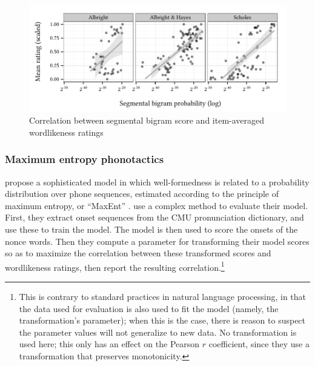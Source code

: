 \begin{figure}
\centering
\includegraphics{bigram.pdf}
\caption{Correlation between segmental bigram score and item-averaged wordlikeness ratings}
\label{bigram}
\end{figure}

\subsubsection{Maximum entropy phonotactics}

\citet{Hayes2008a} propose a sophisticated model in which well-formedness is related to a probability distribution over phone sequences, estimated according to the principle of maximum entropy, or ``MaxEnt'' \citep[e.g.,][]{Goldwater2003,Jager2007}. \citeauthor{Hayes2008a} use a complex method to evaluate their model. First, they extract onset sequences from the CMU pronunciation dictionary, and use these to train the model. The model is then used to score the onsets of the \citet{Scholes1966} nonce words. Then they compute a parameter for transforming their model scores so as to maximize the correlation between these transformed scores and wordlikeness ratings, then report the resulting correlation.\footnote{This is contrary to standard practices in natural language processing, in that the data used for evaluation is also used to fit the model (namely, the transformation's parameter); when this is the case, there is reason to suspect the parameter values will not generalize to new data.
No transformation is used here; this only has an effect on the Pearson $r$ coefficient, since they use a transformation that preserves monotonicity.}

